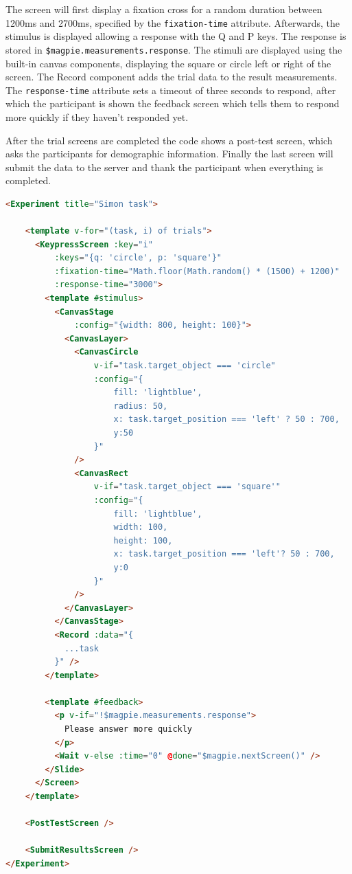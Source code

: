 \documentclass[a4paper,11pt]{scrreprt}
\begin{document}
The screen will first display a fixation cross for a random duration between 1200ms and 2700ms, specified by the \texttt{fixation-time} attribute. Afterwards, the stimulus is displayed allowing a response with the Q and P keys. The response is stored in \texttt{\$magpie.measurements.response}. The stimuli are displayed using the built-in canvas components, displaying the square or circle left or right of the screen. The Record component adds the trial data to the result measurements. The \texttt{response-time} attribute sets a timeout of three seconds to respond, after which the participant is shown the feedback screen which tells them to respond more quickly if they haven't responded yet.

After the trial screens are completed the code shows a post-test screen, which asks the participants for demographic information. Finally the last screen will submit the data to the server and thank the participant when everything is completed.

\begin{lstlisting}[language=html]
<Experiment title="Simon task">

    <template v-for="(task, i) of trials">
      <KeypressScreen :key="i"
          :keys="{q: 'circle', p: 'square'}"
          :fixation-time="Math.floor(Math.random() * (1500) + 1200)"
          :response-time="3000">
        <template #stimulus>
          <CanvasStage
              :config="{width: 800, height: 100}">
            <CanvasLayer>
              <CanvasCircle
                  v-if="task.target_object === 'circle"
                  :config="{
                      fill: 'lightblue',
                      radius: 50,
                      x: task.target_position === 'left' ? 50 : 700,
                      y:50
                  }"
              />
              <CanvasRect
                  v-if="task.target_object === 'square'"
                  :config="{
                      fill: 'lightblue',
                      width: 100,
                      height: 100,
                      x: task.target_position === 'left'? 50 : 700,
                      y:0
                  }"
              />
            </CanvasLayer>
          </CanvasStage>
          <Record :data="{
            ...task
          }" />
        </template>

        <template #feedback>
          <p v-if="!$magpie.measurements.response">
          	Please answer more quickly
          </p>
          <Wait v-else :time="0" @done="$magpie.nextScreen()" />
        </Slide>
      </Screen>
    </template>

    <PostTestScreen />

    <SubmitResultsScreen />
</Experiment>
\end{lstlisting}
\end{document}
